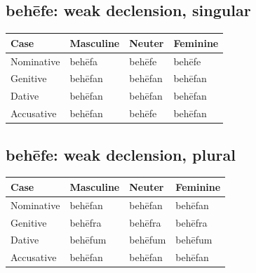\subsection*{behēfe: weak declension, singular}

\par\begingroup
\fontsize{10.5}{13.2}\selectfont
\setlength{\LTleft}{0pt}\setlength{\LTright}{\fill}
\noindent
\begin{tabular}{@{}>{\raggedright\arraybackslash}p{28.89mm}>{\raggedright\arraybackslash}p{28.89mm}>{\raggedright\arraybackslash}p{28.89mm}>{\raggedright\arraybackslash}p{28.89mm}@{}}
\toprule
\textbf{Case} & \textbf{Masculine} & \textbf{Neuter} & \textbf{Feminine} \\
\midrule
Nominative & behēfa & behēfe & behēfe \\
Genitive & behēfan & behēfan & behēfan \\
Dative & behēfan & behēfan & behēfan \\
Accusative & behēfan & behēfe & behēfan \\
\bottomrule
\end{tabular}
\par\endgroup

\subsection*{behēfe: weak declension, plural}

\par\begingroup
\fontsize{10.5}{13.2}\selectfont
\setlength{\LTleft}{0pt}\setlength{\LTright}{\fill}
\noindent
\begin{tabular}{@{}>{\raggedright\arraybackslash}p{28.89mm}>{\raggedright\arraybackslash}p{28.89mm}>{\raggedright\arraybackslash}p{28.89mm}>{\raggedright\arraybackslash}p{28.89mm}@{}}
\toprule
\textbf{Case} & \textbf{Masculine} & \textbf{Neuter} & \textbf{Feminine} \\
\midrule
Nominative & behēfan & behēfan & behēfan \\
Genitive & behēfra & behēfra & behēfra \\
Dative & behēfum & behēfum & behēfum \\
Accusative & behēfan & behēfan & behēfan \\
\bottomrule
\end{tabular}
\par\endgroup

